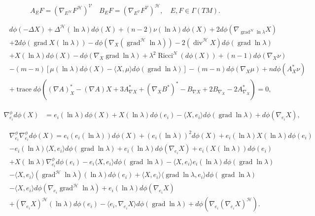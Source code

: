 \documentclass[12pt]{article}
\begin{document}
$$ A_{E}F = (\nabla_{E^{\mathcal{H}}} F^{\mathcal{H}})^{\mathcal{V}} \quad B_{E}F = (\nabla_{E^{\mathcal{V}}}F^{\mathcal{V}})^{\mathcal{H}}, \quad E,F \in \Gamma(TM).$$

\begin{align*}
& d\phi(-\Delta X) + \Delta^{\mathcal{H}} (\ln\lambda) d\phi(X) + (n-2) \nu(\ln\lambda)d\phi(X)
  + 2 d\phi(\nabla_{\operatorname{grad}^{\mathcal{H}} \ln\lambda} X) \\
  &+ 2d\phi(\operatorname{grad} X(\ln\lambda))-d\phi(\nabla_{X} (\operatorname{grad}^{\mathcal{H}}\ln\lambda)) -2 (\operatorname{div}^{\mathcal{H}} X) d\phi(\operatorname{grad} \ln\lambda)\\
& + X(\ln \lambda)d\phi(X) 
 - d\phi (\nabla_{X} \operatorname{grad} \ln\lambda) + \lambda^2 \operatorname{Ricci}^{N}(d\phi(X))
 + (n-1) d\phi(\nabla_{X} \nu)  \\
 &- (m-n)[ \mu(\ln\lambda) d\phi(X) - \langle X, \mu \rangle d\phi(\operatorname{grad}\ln\lambda)]
-(m-n)d\phi (\nabla_{X} \mu)+ n d\phi(A^{*}_{X}\nu) \\
&+ \operatorname{trace} d\phi( (\nabla A)^{*}_{X} - (\nabla A)X + 3A^{*}_{\nabla X} + (\nabla_{X}
B^{*})^{*} - B_{\nabla X} + 2 B_{\nabla_{X}} -2 A^{*}_{\nabla_{X}} ) = 0,
\end{align*}

\begin{align*}
\nabla^{\phi}_{e_{i}} d\phi(X)
&= e_{i}(\ln \lambda) d\phi(X) + X(\ln \lambda) d\phi(e_{i}) - \langle X,e_{i}\rangle
d\phi(\operatorname{grad} \ln \lambda) + d\phi(\nabla_{e_{i}}X) ,
\end{align*}

\begin{align*}
&\nabla^{\phi}_{e_{i}} \nabla^{\phi}_{e_{i}} d\phi(X) 
= e_{i}(e_{i}(\ln \lambda)) d\phi(X) + (e_{i}(\ln \lambda))^2 d\phi(X) + e_{i}(\ln \lambda)X(\ln \lambda)d\phi(e_{i}) \\
&-e_{i}(\ln \lambda)\langle X,e_{i} \rangle d\phi(\operatorname{grad}\ln \lambda)
+ e_{i}(\ln \lambda)d\phi(\nabla_{e_{i}}X) + e_{i}(X(\ln\lambda))d\phi(e_{i}) \\
&+ X(\ln\lambda) \nabla^{\phi}_{e_{i}} d\phi(e_{i}) - e_{i}\langle X,e_{i} \rangle
d\phi(\operatorname{grad}\ln \lambda)
- \langle X,e_{i} \rangle e_{i}(\ln \lambda) d\phi(\operatorname{grad}\ln \lambda) \\
&- \langle X,e_{i} \rangle (\operatorname{grad}^{\mathcal{H}}\ln \lambda) (\ln \lambda) d\phi(e_{i})
+ \langle X,e_{i} \rangle \langle \operatorname{grad}\ln\lambda ,e_{i} \rangle d\phi(\operatorname{grad}\ln \lambda) \\
&- \langle X,e_{i} \rangle d\phi(\nabla_{e_{i}} \operatorname{grad}^{\mathcal{H}}\ln\lambda) + e_{i}(\ln \lambda)d\phi(\nabla_{e_{i}}X) \\
&+ (\nabla_{e_{i}}X)^{\mathcal{H}}(\ln\lambda)d\phi(e_{i}) - \langle e_{i},\nabla_{e_{i}}X
\rangle d\phi(\operatorname{grad}\ln\lambda) + d\phi(\nabla_{e_{i}}(\nabla_{e_{i}}X)^{\mathcal{H}}) .
\end{align*}
\end{document}
